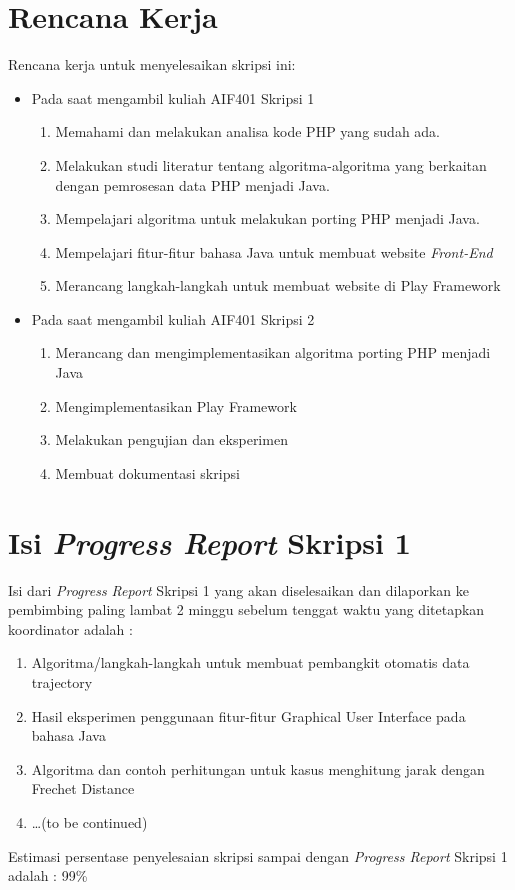 \documentclass[a4paper,twoside]{article}
\begin{document}
\section{Rencana Kerja}

Rencana kerja untuk menyelesaikan skripsi ini:
\begin{itemize}
	\item Pada saat mengambil kuliah AIF401 Skripsi 1
	\begin{enumerate}
		\item Memahami dan melakukan analisa kode PHP yang sudah ada.
		\item Melakukan studi literatur tentang algoritma-algoritma yang berkaitan dengan pemrosesan data PHP menjadi Java.
		\item Mempelajari algoritma untuk melakukan porting PHP menjadi Java.
		\item Mempelajari fitur-fitur bahasa Java untuk membuat website \textit{Front-End}
		\item Merancang langkah-langkah untuk membuat website di Play Framework
	\end{enumerate}
	\item Pada saat mengambil kuliah AIF401 Skripsi 2
	\begin{enumerate}
		\item Merancang dan mengimplementasikan algoritma porting PHP menjadi Java
		\item Mengimplementasikan Play Framework
		\item Melakukan pengujian dan eksperimen
		\item Membuat dokumentasi skripsi
	\end{enumerate}
\end{itemize}

\section{Isi {\it Progress Report} Skripsi 1}
Isi dari {\it Progress Report} Skripsi 1 yang akan diselesaikan dan dilaporkan ke pembimbing paling lambat 2 minggu sebelum tenggat waktu yang ditetapkan koordinator adalah :
\begin{enumerate}
	\item Algoritma/langkah-langkah untuk membuat pembangkit otomatis data trajectory
	\item Hasil eksperimen penggunaan fitur-fitur Graphical User Interface pada bahasa Java
	\item Algoritma dan contoh perhitungan untuk kasus menghitung jarak dengan Frechet Distance
	\item \ldots (to be continued)
\end{enumerate}
Estimasi persentase penyelesaian skripsi sampai dengan {\it Progress Report} Skripsi 1 adalah : 99\%
\end{document}
